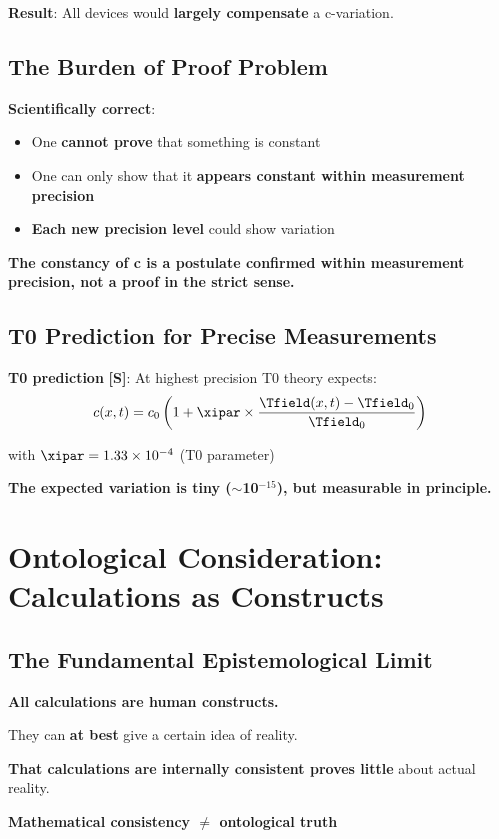 	\textbf{Result}: All devices would \textbf{largely compensate} a c-variation.
	
	\subsection{The Burden of Proof Problem}
	
	\textbf{Scientifically correct}:
	\begin{itemize}
		\item One \textbf{cannot prove} that something is constant
		\item One can only show that it \textbf{appears constant within measurement precision}
		\item \textbf{Each new precision level} could show variation
	\end{itemize}
	
	\textbf{The constancy of c is a postulate confirmed within measurement precision, not a proof in the strict sense.}
	
	\subsection{T0 Prediction for Precise Measurements}
	
	\textbf{T0 prediction} \textbf{[S]}: At highest precision T0 theory expects:
	\begin{equation}
		c(x,t) = c_0 \left(1 + \xipar \times \frac{\Tfield(x,t) - \Tfield_0}{\Tfield_0}\right)
	\end{equation}
	
	with $\xipar = 1.33 \times 10^{-4}$ (T0 parameter)
	
	\textbf{The expected variation is tiny ($\sim$10$^{-15}$), but measurable in principle.}
	
	\section{Ontological Consideration: Calculations as Constructs}
	
	\subsection{The Fundamental Epistemological Limit}
	
	\begin{tcolorbox}[colback=purple!5!white,colframe=purple!75!black,title=Ontological Limit]
		\textbf{All calculations are human constructs.}
		
		They can \textbf{at best} give a certain idea of reality.
		
		\textbf{That calculations are internally consistent proves little} about actual reality.
		
		\textbf{Mathematical consistency $\neq$ ontological truth}
	\end{tcolorbox}
	

